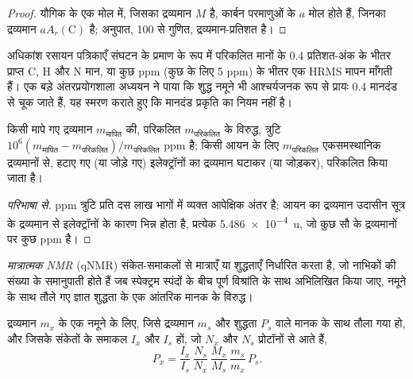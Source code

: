 \begin{proof}
यौगिक के एक मोल में, जिसका द्रव्यमान $M$ है, कार्बन परमाणुओं के $a$ मोल होते हैं, जिनका द्रव्यमान $aA_r(\mathrm C)$ है;
अनुपात, 100 से गुणित, द्रव्यमान-प्रतिशत है।
\end{proof}

अधिकांश रसायन पत्रिकाएँ संघटन के प्रमाण के रूप में परिकलित मानों के 0.4 प्रतिशत-अंक
के भीतर प्राप्त C, H और N मान, या कुछ ppm (कुछ के लिए 5 ppm) के भीतर
एक HRMS मापन माँगती हैं। एक बड़े अंतरप्रयोगशाला अध्ययन ने पाया कि
शुद्ध नमूने भी आश्चर्यजनक रूप से प्रायः 0.4 मानदंड से चूक जाते हैं, यह स्मरण कराते हुए कि
मानदंड प्रकृति का नियम नहीं है।

\begin{proposition}[HRMS त्रुटि]\label{prop:b3:lab-techniques-3:ppm-error}
किसी मापे गए द्रव्यमान $m_{\text{मापित}}$ की, परिकलित $m_{\text{परिकलित}}$ के विरुद्ध, त्रुटि
$10^6(m_{\text{मापित}} - m_{\text{परिकलित}})/m_{\text{परिकलित}}$ ppm है; किसी आयन के लिए $m_{\text{परिकलित}}$ एकसमस्थानिक द्रव्यमानों से, हटाए गए (या जोड़े गए)
इलेक्ट्रॉनों का द्रव्यमान घटाकर (या जोड़कर), परिकलित किया जाता है।
\end{proposition}

\begin{proof}[परिभाषा से]
ppm त्रुटि प्रति दस लाख भागों में व्यक्त आपेक्षिक अंतर है; आयन का
द्रव्यमान उदासीन सूत्र के द्रव्यमान से इलेक्ट्रॉनों के कारण भिन्न होता है, प्रत्येक \qty{5.486e-4}{u}, जो
कुछ सौ के द्रव्यमानों पर कुछ ppm है।
\end{proof}

\begin{definition}[मात्रात्मक NMR]\label{def:b3:lab-techniques-3:qnmr}
\emph{मात्रात्मक NMR} (qNMR) संकेत-समाकलों से मात्राएँ या
शुद्धताएँ निर्धारित करता है, जो नाभिकों की संख्या के समानुपाती होते हैं
जब स्पेक्ट्रम स्पंदों के बीच पूर्ण विश्रांति के साथ अभिलिखित किया जाए, नमूने के साथ
तौले गए ज्ञात शुद्धता के एक आंतरिक मानक के विरुद्ध।
\end{definition}

\begin{proposition}[qNMR शुद्धता]\label{prop:b3:lab-techniques-3:qnmr}
द्रव्यमान $m_x$ के एक नमूने के लिए, जिसे द्रव्यमान $m_s$ और शुद्धता $P_s$ वाले मानक के साथ तौला गया हो, और जिसके संकेतों
के समाकल $I_x$ और $I_s$ हों, जो $N_x$ और $N_s$ प्रोटॉनों से आते हैं,
\[
  P_x = \frac{I_x}{I_s}\,\frac{N_s}{N_x}\,\frac{M_x}{M_s}\,\frac{m_s}{m_x}\,P_s.
\]
\end{proposition}

